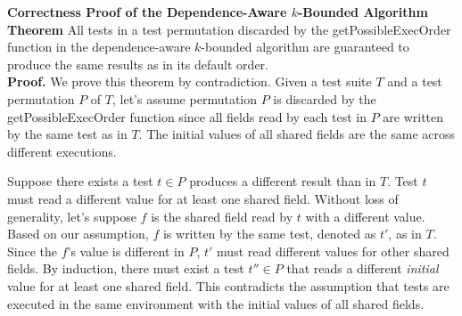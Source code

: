\documentclass[12pt]{article}
\begin{document}


\noindent \textbf{Correctness Proof of the Dependence-Aware $k$-Bounded Algorithm}\\


\noindent \textbf{Theorem} All tests in a test permutation discarded by the getPossibleExecOrder
function in the dependence-aware $k$-bounded algorithm are guaranteed to produce the same results as in its default order.\\



\noindent \textbf{Proof.} We prove this theorem by contradiction. Given a test
suite $T$ and a test permutation $P$ of $T$, let's assume
permutation $P$ is discarded by the getPossibleExecOrder function
since all fields read by each test in $P$ are written
by the same test as in $T$. The initial values of all shared fields are the same across different executions.


Suppose there exists a test $t \in P$ produces a different result
than in $T$. Test $t$ must read a different value
for at least one shared field. Without loss of generality,
let's suppose $f$ is the shared field read by $t$ with
a different value. Based on our assumption, 
$f$ is written by the same test, denoted as $t'$, as in $T$.
Since the $f$'s value is different in $P$, $t'$
must read different values for other shared fields.
By induction, there must exist a test $t'' \in P$ that 
reads a different \textit{initial} value
for at least one shared field. This contradicts
the assumption that tests are executed in the same environment with the initial values of all shared fields.
\end{document}
